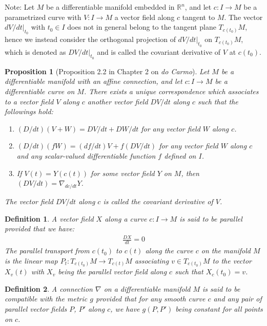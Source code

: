 \documentclass[11pt]{book}
\theoremstyle{break}
\theoremstyle{break}
\newtheorem{prop}[lem]{Proposition}
\newtheorem{defn}{Definition}[corL]
\newcommand{\R}{\mathbb{R}}
\newcommand{\note}{\color{red}Note: \color{black}}
\begin{document}
\note Let $M$ be a differentiable manifold embedded in $\R^n$, and let $c:I \to M$ be a parametrized curve with $V:I \to M$ a vector field along $c$ tangent to $M$. The vector $dV/dt|_{t_0}$ with $t_0 \in I$ does not in general belong to the tangent plane $T_{c(t_0)}M$, hence we instead consider the orthogonal projection of $dV/dt|_{t_0}$ on $T_{c(t_0)}M$, which is denoted as $DV/dt|_{t_0}$ and is called the covariant derivative of $V$ at $c(t_0)$. 





\begin{prop}[Proposition 2.2 in Chapter 2 on \textit{do Carmo}]
Let $M$ be a differentiable manifold with an affine connection, and let $c:I \to M$ be a differentiable curve on $M$. There exists a unique correspondence which associates to a vector field $V$ along $c$ another vector field $DV/dt$ along $c$ such that the followings hold:
\begin{enumerate}[topsep=3pt,itemsep=-1ex,partopsep=1ex,parsep=1ex]
\item $(D/dt)(V+W) = DV/dt + DW/dt$ for any vector field $W$ along $c$.
\item $(D/dt)(fW) = (df/dt)V + f(DV/dt)$ for any vector field $W$ along $c$ and any scalar-valued differentiable function $f$ defined on $I$. 
\item If $V (t)= Y(c(t))$ for some vector field $Y$ on $M$, then $(DV/dt) = \nabla_{dc/dt}Y$. 
\end{enumerate}
The vector field $DV/dt$ along $c$ is called the covariant derivative of $V$.  
\end{prop}

\begin{defn}
A vector field $X$ along a curve $c:I \to M$ is said to be parallel provided that we have:
\begin{align*}
\frac{DX}{dt}  = 0
\end{align*}
The parallel transport from $c(t_0)$ to $c(t)$ along the curve $c$ on the manifold $M$ is the linear map $P_t : T_{c(t_0)}M \to T_{c(t)}M$ associating $v \in T_{c(t_0)}M$ to the vector $X_v(t)$ with $X_v$ being the parallel vector field along $c$ such that $X_c(t_0) = v$. 
\end{defn}


\begin{defn}
A connection $\nabla$ on a differentiable manifold $M$ is said to be compatible with the metric $g$ provided that for any smooth curve $c$ and any pair of parallel vector fields $P$, $P'$ along $c$, we have $g(P,P')$ being constant for all points on $c$.
\end{defn}
\end{document}
